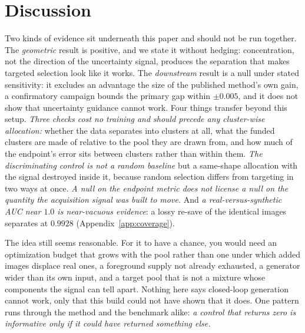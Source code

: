 \documentclass{article}
\begin{document}
\section{Discussion}
\label{sec:discussion}
Two kinds of evidence sit underneath this paper and should not be run together. The
\emph{geometric} result is positive, and we state it without hedging: concentration, not the
direction of the uncertainty signal, produces the separation that makes targeted selection look like it works. The \emph{downstream} result is a null under stated sensitivity: it excludes an advantage the size of the published method's own gain, a confirmatory campaign bounds the primary gap within $\pm0.005$, and it does not show that uncertainty guidance cannot work. Four things transfer beyond this setup. \textit{Three checks cost no training and should precede any
cluster-wise allocation:} whether the data separates into clusters at all, what the funded clusters
are made of relative to the pool they are drawn from, and how much of the endpoint's error sits
between clusters rather than within them. \textit{The discriminating control is not a random
baseline} but a same-shape allocation with the signal destroyed inside it, because random selection
differs from targeting in two ways at once. \textit{A null on the endpoint metric does not license a
null on the quantity the acquisition signal was built to move.} And \textit{a real-versus-synthetic AUC near $1.0$ is near-vacuous evidence}: a lossy re-save of the identical images separates at
$0.9928$ (Appendix~\ref{app:coverage}).

The idea still seems reasonable. For it to have a chance, you would need an optimization budget that
grows with the pool rather than one under which added images displace real ones, a foreground supply
not already exhausted, a generator wider than its own input, and a target pool that is not a mixture
whose components the signal can tell apart. Nothing here says closed-loop generation cannot work,
only that this build could not have shown that it does. One pattern runs through the method and the
benchmark alike: \textit{a control that returns zero is informative only if it could have returned
something else.}
\end{document}
